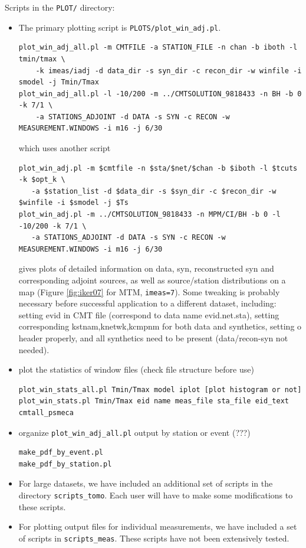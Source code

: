 \documentclass[11pt,titlepage,fleqn]{article}
\begin{document}
Scripts in the \verb+PLOT/+ directory:
%
\begin{itemize}
\item The primary plotting script is \verb+PLOTS/plot_win_adj.pl+.
\begin{verbatim}
plot_win_adj_all.pl -m CMTFILE -a STATION_FILE -n chan -b iboth -l tmin/tmax \
    -k imeas/iadj -d data_dir -s syn_dir -c recon_dir -w winfile -i smodel -j Tmin/Tmax
plot_win_adj_all.pl -l -10/200 -m ../CMTSOLUTION_9818433 -n BH -b 0 -k 7/1 \
    -a STATIONS_ADJOINT -d DATA -s SYN -c RECON -w MEASUREMENT.WINDOWS -i m16 -j 6/30
\end{verbatim}
which uses another script
\begin{verbatim}
plot_win_adj.pl -m $cmtfile -n $sta/$net/$chan -b $iboth -l $tcuts -k $opt_k \
   -a $station_list -d $data_dir -s $syn_dir -c $recon_dir -w $winfile -i $smodel -j $Ts
plot_win_adj.pl -m ../CMTSOLUTION_9818433 -n MPM/CI/BH -b 0 -l -10/200 -k 7/1 \
   -a STATIONS_ADJOINT -d DATA -s SYN -c RECON -w MEASUREMENT.WINDOWS -i m16 -j 6/30
\end{verbatim}
gives plots of detailed information on data, syn, reconstructed syn and corresponding adjoint sources, as well as 
source/station distributions on a map (Figure \ref{fig:iker07} for MTM, \verb+imeas=7+).
Some tweaking is probably necessary before successful application to a different dataset, including: setting
evid in CMT file (correspond to data name evid.net.sta), setting corresponding kstnam,knetwk,kcmpnm for both
data and synthetics, setting o header properly, and all synthetics need to be present (data/recon-syn not needed).


\item  plot the statistics of window files (check file structure before use)
\begin{verbatim}
plot_win_stats_all.pl Tmin/Tmax model iplot [plot histogram or not]
plot_win_stats.pl Tmin/Tmax eid name meas_file sta_file eid_text cmtall_psmeca
\end{verbatim}

\item organize \verb+plot_win_adj_all.pl+ output by station or event (???)
\begin{verbatim}
make_pdf_by_event.pl
make_pdf_by_station.pl
\end{verbatim}

\item For large datasets, we have included an additional set of scripts in the directory \verb+scripts_tomo+. Each user will have to make some modifications to these scripts.

\item For plotting output files for individual measurements, we have included a set of scripts in \verb+scripts_meas+.  These scripts have not been extensively tested.
\end{itemize}
\end{document}
